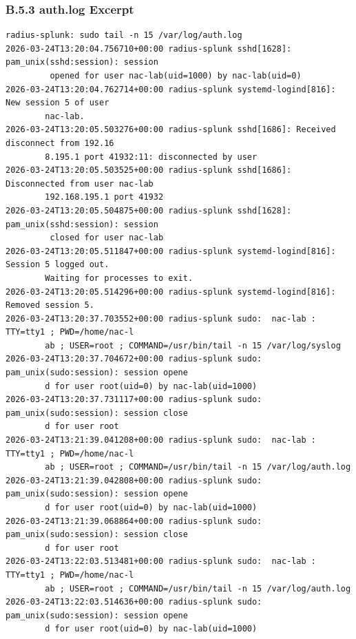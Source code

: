 \documentclass[11pt]{article}
\begin{document}
\subsubsection{B.5.3 auth.log Excerpt}
\label{sec:appendix-b-auth-log-excerpt}

\begin{verbatim}
radius-splunk: sudo tail -n 15 /var/log/auth.log
2026-03-24T13:20:04.756710+00:00 radius-splunk sshd[1628]: pam_unix(sshd:session): session
         opened for user nac-lab(uid=1000) by nac-lab(uid=0)
2026-03-24T13:20:04.762714+00:00 radius-splunk systemd-logind[816]: New session 5 of user 
        nac-lab.
2026-03-24T13:20:05.503276+00:00 radius-splunk sshd[1686]: Received disconnect from 192.16
        8.195.1 port 41932:11: disconnected by user
2026-03-24T13:20:05.503525+00:00 radius-splunk sshd[1686]: Disconnected from user nac-lab 
        192.168.195.1 port 41932
2026-03-24T13:20:05.504875+00:00 radius-splunk sshd[1628]: pam_unix(sshd:session): session
         closed for user nac-lab
2026-03-24T13:20:05.511847+00:00 radius-splunk systemd-logind[816]: Session 5 logged out. 
        Waiting for processes to exit.
2026-03-24T13:20:05.514296+00:00 radius-splunk systemd-logind[816]: Removed session 5.
2026-03-24T13:20:37.703552+00:00 radius-splunk sudo:  nac-lab : TTY=tty1 ; PWD=/home/nac-l
        ab ; USER=root ; COMMAND=/usr/bin/tail -n 15 /var/log/syslog
2026-03-24T13:20:37.704672+00:00 radius-splunk sudo: pam_unix(sudo:session): session opene
        d for user root(uid=0) by nac-lab(uid=1000)
2026-03-24T13:20:37.731117+00:00 radius-splunk sudo: pam_unix(sudo:session): session close
        d for user root
2026-03-24T13:21:39.041208+00:00 radius-splunk sudo:  nac-lab : TTY=tty1 ; PWD=/home/nac-l
        ab ; USER=root ; COMMAND=/usr/bin/tail -n 15 /var/log/auth.log
2026-03-24T13:21:39.042808+00:00 radius-splunk sudo: pam_unix(sudo:session): session opene
        d for user root(uid=0) by nac-lab(uid=1000)
2026-03-24T13:21:39.068864+00:00 radius-splunk sudo: pam_unix(sudo:session): session close
        d for user root
2026-03-24T13:22:03.513481+00:00 radius-splunk sudo:  nac-lab : TTY=tty1 ; PWD=/home/nac-l
        ab ; USER=root ; COMMAND=/usr/bin/tail -n 15 /var/log/auth.log
2026-03-24T13:22:03.514636+00:00 radius-splunk sudo: pam_unix(sudo:session): session opene
        d for user root(uid=0) by nac-lab(uid=1000)
\end{verbatim}

\end{document}
